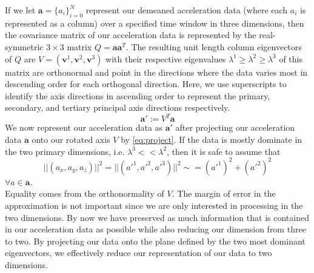 \documentclass[journal]{IEEEtran}
\begin{document}
If we let $\textbf{a} = \{a_i\}_{i=0}^{N}$ represent our demeaned acceleration data (where each $a_i$ is represented as a column) over a specified time window in three dimensions, then the covariance matrix of our acceleration data is represented by the real-symmetric $3 \times 3$ matrix $Q = \textbf{a} \textbf{a}^T$.
The resulting unit length column eigenvectors of $Q$ are $V = (\textbf{v}^1,\textbf{v}^2,\textbf{v}^3)$ with their respective eigenvalues $\lambda^1 \geq \lambda^2 \geq \lambda^3$ of this matrix are orthonormal and point in the directions where the data varies most in descending order for each orthogonal direction. Here, we use superscripts to identify the axis directions in ascending order to represent the primary, secondary, and tertiary principal axis directions respectively.
\begin{equation} \label{eq:project}
   \textbf{a}' := V^T \textbf{a}
\end{equation}
%
We now represent our acceleration data as $\textbf{a}'$ after projecting our acceleration data $\textbf{a}$ onto our rotated axis $V$ by \eqref{eq:project}. If the data is mostly dominate in the two primary dimensions, i.e. $\lambda^3 << \lambda^2$, then it is safe to assume that
%
\begin{equation} \label{eq:magnitude}
||(a_x,a_y,a_z)||^2 = ||(a'^1,a'^2,a'^3)||^2 \sim = (a'^1)^2 + (a'^2)^2
\end{equation}
$ \forall a \in \textbf{a}. $ \\
%
Equality comes from the orthonormality of $V$. The margin of error in the approximation is not important since we are only interested in processing in the two dimensions.
By now we have preserved as much information that is contained in our acceleration data as possible while also reducing our dimension from three to two.
By projecting our data onto the plane defined by the two most dominant eigenvectors, we effectively reduce our representation of our data to two dimensions.
\end{document}
